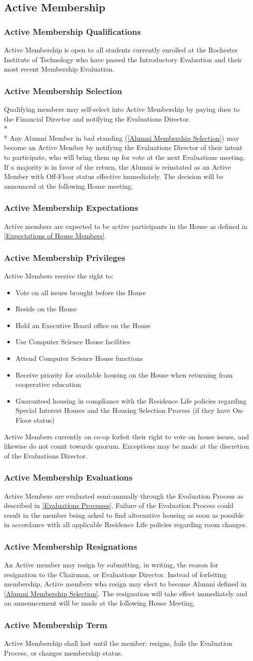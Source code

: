 \documentclass{article}
\newcommand{\asection}[1]{\subsection{#1} \label{#1}}
\newcommand{\asubsection}[1]{\subsubsection{#1} \label{#1}}
\begin{document}
\asection{Active Membership}
\asubsection{Active Membership Qualifications}
Active Membership is open to all students currently enrolled at the Rochester Institute of Technology who have passed the Introductory Evaluation and their most recent Membership Evaluation.
\asubsection{Active Membership Selection}
Qualifying members may self-select into Active Membership by paying dues to the Financial Director and notifying the Evaluations Director.
\\*\\*
Any Alumni Member in bad standing (\ref{Alumni Membership Selection}) may become an Active Member by notifying the Evaluations Director of their intent to participate, who will bring them up for vote at the next Evaluations meeting. If a majority is in favor of the return, the Alumni is reinstated as an Active Member with Off-Floor status effective immediately. The decision will be announced at the following House meeting.
\asubsection{Active Membership Expectations}
Active members are expected to be active participants in the House as defined in \ref{Expectations of House Members}.
\asubsection{Active Membership Privileges}
Active Members receive the right to:
\begin{itemize}
	\item Vote on all issues brought before the House
	\item Reside on the House
	\item Hold an Executive Board office on the House
	\item Use Computer Science House facilities
	\item Attend Computer Science House functions
	\item Receive priority for available housing on the House when returning from cooperative education
	\item Guaranteed housing in compliance with the Residence Life policies regarding Special Interest Houses and the Housing Selection Process (if they have On-Floor status)
\end{itemize}
Active Members currently on co-op forfeit their right to vote on house issues, and likewise do not count towards quorum. Exceptions may be made at the discretion of the Evaluations Director.
\asubsection{Active Membership Evaluations}
Active Members are evaluated semi-annually through the Evaluation Process as described in \ref{Evaluations Processes}.  Failure of the Evaluation Process could result in the member being asked to find alternative housing as soon as possible in accordance with all applicable Residence Life policies regarding room changes.
\asubsection{Active Membership Resignations}
An Active member may resign by submitting, in writing, the reason for resignation to the Chairman, or Evaluations Director. Instead of forfeiting membership, Active members who resign may elect to become Alumni defined in \ref{Alumni Membership Selection}. The resignation will take effect immediately and an announcement will be made at the following House Meeting.
\asubsection{Active Membership Term}
Active Membership shall last until the member: resigns, fails the Evaluation Process, or changes membership status.
\end{document}
